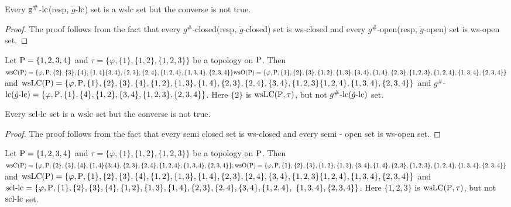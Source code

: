 \begin{thm}\label{thm7.2.6}
Every $\mathrm{g}^{\text{\#}}$-$\mathrm{lc}$(resp, $\ddot{g}$-$\mathrm{lc}$) set is a wslc set but the converse is not true.

\end{thm}

\begin{proof}
The proof follows from the fact that every $g^{\text{\#}}$-closed(resp, $\ddot{g}$-closed) set is ws-closed and every $g^{\text{\#}}$-open(resp, $\ddot{g}$-open) set is ws-open set.
\end{proof}

\begin{exm}\label{exam7.2.7}
Let $\mathrm{P} = \{1, 2, 3, 4\}$ and $\tau = \{\varphi, \{1\}, \{1, 2\}, \{1, 2, 3\}\}$ be a topology on $\mathrm{P}$. Then $\ws\TSC(\TSP) = \{\varphi, \TSP, \{2\}, \{3\}, \{4\},\{1, 4\} \{3,4\}, \{2,3\}, \{2,4\},\{1,2,4\},\break \{1,3,4\},\{2,3,4\}\} \ws\TSO(\TSP) = \{\varphi, \TSP, \{1\}, \{2\}, \{3\},\{1,2\}, \{1,3\},\{3,4\}, \{1,4\}, \{2,3\},\break \{1,2,3\}, \{1,2,4\},\{1,3,4\},\{2,3,4\}\}$ and $\ws\TSL\TSC(\TSP)= \{\varphi, \TSP,\{1\}, \{2\}, \{3\},\{4\},\{1,2\},\break \{1,3\}, \{1,4\},\{2,3\}, \{2,4\},\{3,4\}, \{1, 2, 3\}\{1,2,4\},\{1,3,4\},\{2,3,4\}\}$ and $g^{\text{\#}}$-$\lc(\ddot{g}\text{-}\lc)\break = \{\varphi,\TSP,\{1\},\{4\},\{1,2\},\{3, 4\},\{1,2,3\},\{2,3,4\}\}$. Here $\{2\}$ is $\mathrm{ws}\mathrm{LC}(\mathrm{P}, \tau)$, but not $g^{\text{\#}}\text{-}\mathrm{lc}(\ddot{g}\text{-}\mathrm{lc})$ set.
\end{exm}

\begin{thm}\label{thm7.2.7}
Every $\mathrm{scl}\text{-}\mathrm{lc}$ set is a $\mathrm{wslc}$ set but the converse is not true.
\end{thm}

\begin{proof}
The proof follows from the fact that every semi closed set is ws-closed and every semi - open set is ws-open set.
\end{proof}

\begin{exm}\label{exam7.2.8}
Let $\mathrm{P} = \{1, 2, 3, 4\}$ and $\tau = \{\varphi, \{1\}, \{1, 2\}, \{1, 2, 3\}\}$ be a topology on $\mathrm{P}$. Then $\ws\TSC(\TSP) = \{\varphi, \TSP, \{2\}, \{3\}, \{4\},\{1, 4\} \{3,4\}, \{2,3\}, \{2,4\},\{1,2, 4\},\break \{1,3,4\},\{2,3,4\}\}, \ws\TSO(\TSP) = \{\varphi, \TSP, \{1\}, \{2\}, \{3\},\{1,2\}, \{1,3\},\{3,4\}, \{1,4\},\{2,3\},\break \{1,2, 3\},\{1,2,4\},\{1,3,4\},\{2,3,4\}\}$ and $\ws\LC(\TSP)= \{\varphi, \TSP,\{1\}, \{2\}, \{3\},\{4\},\{1,2\},\break\{1,3\}, \{1,4\},\{2,3\}, \{2,4\},\{3,4\}, \{1, 2, 3\}\{1,2,4\},\{1,3,4\},\{2,3,4\}\}$ and $\scl\text{-}\lc=\break \{ \varphi, \TSP ,\{1\}, \{2\},\{3\},\{4\},\{1,2\},\{1,3\}, \{1,4\}, \{2,3\}, \{2,4\},\{3,4\},\{1,2,4\},~\{1,3,4\},\break \{2,3,4\}\}$. Here $\{1,2,3\}$ is $\mathrm{ws}\mathrm{LC} (\mathrm{P}, \tau)$, but not $\mathrm{scl}\text{-}\mathrm{lc}$ set.
\end{exm}

